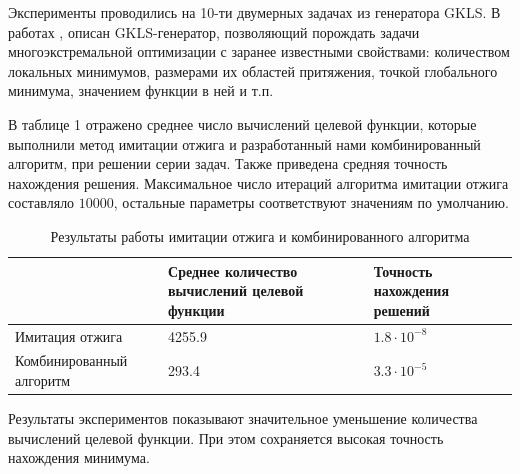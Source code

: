 \documentclass[11pt, oneside, a4paper]{article}
\begin{document}
\newpage



Эксперименты проводились на 10-ти двумерных задачах из генератора GKLS. В работах \cite{fio_bib19}, \cite{fio_bib20} описан GKLS-генератор, позволяющий порождать задачи многоэкстремальной оптимизации с заранее известными свойствами: количеством локальных минимумов, размерами их областей притяжения, точкой глобального минимума, значением функции в ней и т.п. 

В таблице 1 отражено среднее число вычислений целевой функции, которые выполнили метод имитации отжига и разработанный нами комбинированный алгоритм, при решении серии задач. Также приведена средняя точность нахождения решения. Максимальное число итераций алгоритма имитации отжига составляло $10000$, остальные параметры соответствуют значениям по умолчанию. 

\begin{table}
	\caption{Результаты работы имитации отжига и комбинированного алгоритма}
	\begin{center}
		\begin{tabular}{|m{3.8cm}|m{6cm} |m{6cm}|}
			\hline
			 & Среднее количество вычислений целевой функции & Точность нахождения решений\\
			 \hline
			 Имитация отжига & 4255.9 & $1.8 \cdot 10^{-8}$\\
			 \hline 
			 Комбинированный алгоритм & 293.4 & $3.3 \cdot 10^{-5}$\\
			 \hline
		\end{tabular}
	\end{center}
\end{table}

Результаты экспериментов показывают значительное уменьшение количества вычислений целевой функции. При этом сохраняется высокая точность нахождения минимума.
\end{document}
